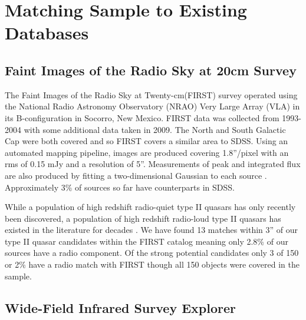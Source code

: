 \documentclass[preprint]{aastex}
\begin{document}
\pagebreak

\section{Matching Sample to Existing Databases}

\subsection{Faint Images of the Radio Sky at 20cm Survey}

The Faint Images of the Radio Sky at Twenty-cm(FIRST) survey operated using the National Radio Astronomy Observatory (NRAO) Very Large Array (VLA)  in its B-configuration in Socorro, New Mexico.  FIRST data was collected from 1993-2004 with some additional data taken in 2009.  The North and South Galactic Cap were both covered and so FIRST covers a similar area to SDSS.  Using an automated mapping pipeline, images are produced covering 1.8''/pixel with an rms of 0.15 mJy and a resolution of 5''.  Measurements of peak and integrated flux are also produced by fitting a two-dimensional Gaussian to each source \citep{hassen}.  Approximately 3$\%$ of sources so far have counterparts in SDSS.

While a population of high redshift radio-quiet type II quasars has only recently been discovered, a population of high redshift radio-loud type II quasars has existed in the literature for decades \citep[see, for example][]{2004AJ....128.1002Z}.  We have found 13 matches within 3'' of our type II quasar candidates within the FIRST catalog meaning only 2.8\% of our sources have a radio component.  Of the strong potential candidates only 3 of 150 or 2\% have a radio match with FIRST though all 150 objects were covered in the sample. %

\subsection{Wide-Field Infrared Survey Explorer}
\end{document}
